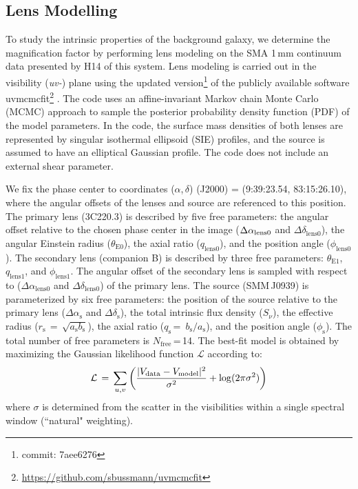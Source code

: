 \documentclass[twocolumn,apj,numberedappendix]{emulateapj}
\begin{document}
\subsection{Lens Modelling} \label{sec:Lens}
To study the intrinsic properties of the background galaxy, we determine the magnification factor by performing
lens modeling on the SMA 1\,mm continuum data presented by H14 of this system. Lens modeling is carried out in the visibility
({\it uv-}) plane using the updated version\footnote{commit: 7aee6276} of the publicly available software {\sc uvmcmcfit}\footnote{\url{https://github.com/sbussmann/uvmcmcfit}}
\citep{Bussmann15a}. The code uses an affine-invariant Markov chain Monte Carlo (MCMC) approach to sample the posterior
probability density function (PDF) of the model parameters. In the code, the surface mass densities of both
lenses are represented by singular isothermal ellipsoid (SIE) profiles, and the source is assumed to have an
elliptical Gaussian profile. The code does not include an external shear parameter.

We fix the phase center to coordinates ($\alpha$,\,$\delta$)\,\,(J2000) = (9:39:23.54,\,\,83:15:26.10), where the
angular offsets of the lenses and source are referenced to this position. The primary lens (3C220.3) is
described by five free parameters: the angular offset relative to
the chosen phase center in the image ($\Delta \alpha_{\rm
lens0}$ and $\Delta \delta_\textrm{lens0}$), the angular Einstein radius ($\theta_\textrm{E0}$), the
axial ratio ($q_\textrm{lens0}$), and the position angle ($\phi_\textrm{lens0}$). The secondary lens (companion B) is
described by three free parameters: $\theta_\textrm{E1}$, $q_\textrm{lens1}$, and $\phi_\textrm{lens1}$. The angular offset
of the secondary
lens is sampled with respect to ($\Delta \alpha_\textrm{lens0}$ and $\Delta \delta_\textrm{lens0}$) of
the primary lens.
The source (SMM\,J0939) is parameterized by
six free parameters: the position of the source relative to the
primary lens ($\Delta \alpha_\textrm{s}$ and $\Delta
\delta_\textrm{s}$), the total intrinsic flux density ($S_\nu$), the
effective radius ($r_\textrm{s}\,=\,\sqrt{a_\textrm{s} b_\textrm{s}}$), the axial
ratio ($q_\textrm{s}$\,=\, $b_\textrm{s}/a_\textrm{s}$), and the position angle
($\phi_\textrm{s}$).
The total number of free parameters is $N_\textrm{free}$\,=\,14. The best-fit model is obtained by maximizing the
Gaussian likelihood function $ \mathcal{L} $ according to:
\begin{equation}
    \mathcal{L}\,=\,\sum_{u, v}\left( \frac{|V_\textrm{data} - V_{\rm
    model}|^2}{\sigma^2} + {\rm log}(2 \pi \sigma^2) \right)
\end{equation}
\noindent where $\sigma$ is determined from the scatter in the visibilities within a
single spectral window (``natural" weighting).
\end{document}
